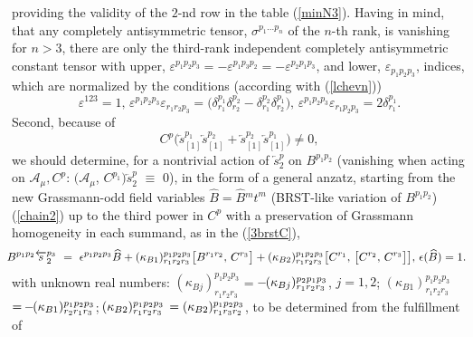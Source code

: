 \documentclass[10pt]{article}
\begin{document}
providing the validity of the $2$-nd row in the table (\ref{minN3}).
Having in mind, that any completely antisymmetric tensor, $\sigma^{p_1...p_n}$ of the $n$-th rank,  is vanishing
for $n>3$, there are only the third-rank independent completely antisymmetric
constant tensor with upper, $\varepsilon^{p_1p_2p_3}=-\varepsilon^{p_1p_3p_2}=-\varepsilon^{p_2p_1p_3}$,
and lower, $\varepsilon_{p_1p_2p_3}$, indices, which are normalized
by the conditions (according with (\ref{lchevn}))
\begin{equation}\label{eprt}
  \varepsilon^{123}= 1, \, \varepsilon^{p_1p_2p_3}\varepsilon_{r_1r_2p_3}= \big(\delta^{p_1}_{r_1}\delta_{r_2}^{p_2} -\delta^{p_2}_{r_1}\delta_{r_2}^{p_1} \big), \, \varepsilon^{p_1p_2p_3}\varepsilon_{r_1p_2p_3}=2\delta^{p_1}_{r_1}.
\end{equation}
Second, because of
\begin{equation}\label{consistC1}
C^{p}\big(\overleftarrow{s}^{p_1}_{[1]}
\overleftarrow{s}^{p_2}_{[1]}+\overleftarrow{s}^{p_2}_{[1]}
\overleftarrow{s}^{p_1}_{[1]}\big) \ne 0,
\end{equation}
we should determine, for a nontrivial action of $\overleftarrow{s}{}^{p}_2$
on $B^{ p_1p_2}$ (vanishing when acting on $\mathcal{A}_\mu, C^p$: $\big(\mathcal{A}_\mu$, $C^{p_1}\big)\overleftarrow{s}{}^p_2$ $\equiv$ $0$), in the form of a general anzatz, starting from the new Grassmann-odd
field variables $\widehat{B}= \widehat{B}{}^{m}t^m$ (BRST-like variation of $B^{p_1p_2}$) (\ref{chain2})
up to the third power in $C^p$ with a preservation of Grassmann homogeneity
in each summand, as in the (\ref{3brstC}),
\begin{eqnarray}\label{3brstB}
\hspace{-0.5em}  &\hspace{-0.5em}&\hspace{-0.5em}  B^{p_1p_2} \overleftarrow{s}{}^{p_3}_2 \ = \ \epsilon^{p_1p_2p_3}   \widehat{B}  +  (\kappa_{B1})^{p_1p_2p_3}_{r_1r_2r_3}  \big[B^{r_1r_2},\,C^{r_3}\big]+ (\kappa_{B2})^{p_1p_2p_3}_{r_1r_2r_3}   \big[C^{r_1},\,\big[C^{r_2},\,C^{r_3}\big]\big]  ,   \,  \epsilon( \widehat{B}) = 1.
\end{eqnarray}
with unknown real numbers: $(\kappa_{Bj})^{p_1p_2p_3}_{r_1r_2r_3}$ = $\hspace{-0.1em}-\hspace{-0.1em}(\kappa_{Bj})^{p_2p_1p_3}_{r_1r_2r_3}$, $j=1,2$;  $(\kappa_{B1})^{p_1p_2p_3}_{r_1r_2r_3}$  $=\hspace{-0.1em}-\hspace{-0.1em}(\kappa_{B1})^{p_1p_2p_3}_{r_2r_1r_3}$; $\hspace{-0.1em}(\kappa_{B2})^{p_1p_2p_3}_{r_1r_2r_3}$  $\hspace{-0.1em}=(\kappa_{B2})^{p_1p_2p_3}_{r_1r_3r_2}$,  to be determined from the fulfillment of
\end{document}
